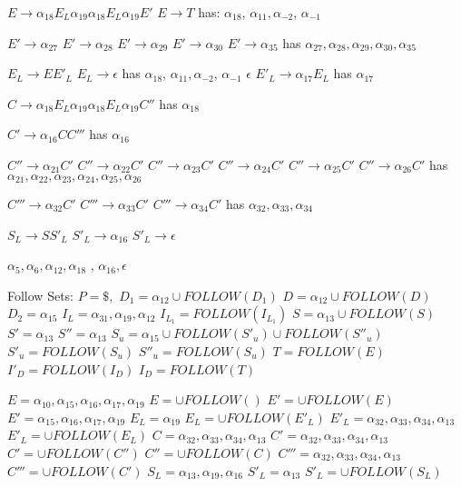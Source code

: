 \documentclass[11pt]{article}
\begin{document}
$E \to \alpha_{18} E_L \alpha_{19}  \alpha_{18} E_L \alpha_{19}  E'$
$E\to T$
has:
$\alpha_{18}$, $\alpha_{11},\alpha_{-2}$, $\alpha_{-1}$

$E'\to  \alpha_{27}$
$E'\to  \alpha_{28}$
$E'\to \alpha_{29}$
$E'\to  \alpha_{30}$
$E'\to  \alpha_{35}$
has 
$\alpha_{27}, \alpha_{28}, \alpha_{29},  \alpha_{30}, \alpha_{35}$

$E_L \to E E'_L $
$E_L \to \epsilon $
has 
$\alpha_{18}$, $\alpha_{11},\alpha_{-2}$, $\alpha_{-1}$ $ \epsilon$
$E'_L \to \alpha_{17} E_L $
has 
$\alpha_{17}$

$C \to \alpha_{18} E_L \alpha_{19} \alpha_{18} E_L \alpha_{19} C'' $
has
$\alpha_{18}$


$C' \to \alpha_{16} C C'''$
has 
$\alpha_{16}$


$C'' \to \alpha _{21} C'$
$C'' \to \alpha _{22} C'$
$C'' \to \alpha _{23} C'$
$C'' \to \alpha _{24} C'$
$C'' \to  \alpha _{25} C'$
$C'' \to \alpha _{26} C'$
has 
$\alpha_{21}, \alpha_{22}, \alpha_{23}, \alpha_{24}, \alpha_{25}, \alpha_{26}$

$C''' \to \alpha_{32} C' $
$C''' \to \alpha_{33} C' $
$C'''  \to \alpha_{34} C'$
has
$\alpha_{32}, \alpha_{33}, \alpha_{34}$

$S_L \to S S'_L$
$S'_L \to \alpha_{16}$ 
$S'_L \to \epsilon$ 

$\alpha_{5}, \alpha_{6}, \alpha_{12}, \alpha_{18}$
 , $\alpha_{16}, \epsilon$


Follow Sets:
$P = \$ , $
$D_1 = \alpha_{12} \cup FOLLOW(D_1 )$
$D = \alpha_{12} \cup FOLLOW(D) $
$D_2 = \alpha_{15}$
$I_L = \alpha_{31}, \alpha_{19}, \alpha_{12}$
$I_{L_1} =  FOLLOW(I_{L_1})$
$S = \alpha_{13} \cup FOLLOW(S) $
$S' = \alpha_{13} $
$S'' = \alpha_{13} $
$S_u = \alpha_{15} \cup FOLLOW(S'_u) \cup FOLLOW(S''_u)$
$S'_u = FOLLOW(S_u)$
$S''_u = FOLLOW(S_u)$
$T = FOLLOW (E) $
$I'_D = FOLLOW(I_D) $
$I_D = FOLLOW(T) $

$E =\alpha_{10} , \alpha_{15}, \alpha_{16}, \alpha_{17}, \alpha_{19}$
$E = \cup FOLLOW()$
$E' = \cup FOLLOW(E)$
$E' = \alpha_{15}, \alpha_{16}, \alpha_{17}, \alpha_{19}$
$E_L = \alpha_{19}$
$E_L = \cup FOLLOW(E'_L)$
$E'_L = \alpha_{32}, \alpha_{33}, \alpha_{34} , \alpha_{13}$
$E'_L = \cup FOLLOW(E_L)$
$C = \alpha_{32}, \alpha_{33}, \alpha_{34}, \alpha_{13}$
$C' = \alpha_{32}, \alpha_{33}, \alpha_{34}, \alpha_{13}$
$C' = \cup FOLLOW(C'')$
$C'' = \cup FOLLOW(C)$
$C''' = \alpha_{32}, \alpha_{33}, \alpha_{34}, \alpha_{13}$
$C''' = \cup FOLLOW(C') $
$S_L = \alpha_{13}, \alpha_{19}, \alpha_{16} $
$S'_L = \alpha_{13} $
$S'_L = \cup FOLLOW(S_L)$
\end{document}
